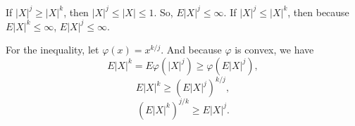 \documentclass[en, normal, 11pt, black]{elegantnote}
\renewenvironment{proof}{\begin{tcolorbox}[colback=white, colframe=black!50, breakable, title=Proof. ]\setlength{\parskip}{0.8em}}{\\\rightline{$\square$}\end{tcolorbox}}
\begin{document}
    \begin{proof}
        If $|X|^j\geqslant|X|^k$, then $|X|^j\leqslant|X|\leqslant1$. So, $E|X|^j\leqslant\infty$. If $|X|^j\leqslant|X|^k$, then because $E|X|^k\leqslant\infty$, $E|X|^j\leqslant\infty$. 
        
        For the inequality, let $\varphi(x)=x^{k/j}$. And because $\varphi$ is convex, we have
        \[
            E|X|^{k}=E\varphi\left(|X|^j\right)\geqslant\varphi\left(E|X|^j\right), 
        \]
        \[
            E|X|^{k}\geqslant\left(E|X|^j\right)^{k/j}, 
        \]
        \[
            \left(E|X|^{k}\right)^{j/k}\geqslant E|X|^j. 
        \]
        \vspace{-30pt}
    \end{proof}
\end{document}
